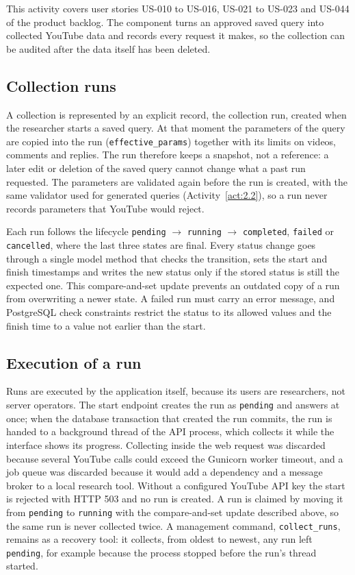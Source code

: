 This activity covers user stories US-010 to US-016, US-021 to US-023 and US-044 of the product backlog. The component turns an approved saved query into collected YouTube data and records every request it makes, so the collection can be audited after the data itself has been deleted.

\subsection{Collection runs}

A collection is represented by an explicit record, the collection run, created when the researcher starts a saved query. At that moment the parameters of the query are copied into the run (\texttt{effective\_\allowbreak params}) together with its limits on videos, comments and replies. The run therefore keeps a snapshot, not a reference: a later edit or deletion of the saved query cannot change what a past run requested. The parameters are validated again before the run is created, with the same validator used for generated queries (Activity~\ref{act:2.2}), so a run never records parameters that YouTube would reject.

Each run follows the lifecycle \texttt{pending} $\rightarrow$ \texttt{running} $\rightarrow$ \texttt{completed}, \texttt{failed} or \texttt{cancelled}, where the last three states are final. Every status change goes through a single model method that checks the transition, sets the start and finish timestamps and writes the new status only if the stored status is still the expected one. This compare-and-set update prevents an outdated copy of a run from overwriting a newer state. A failed run must carry an error message, and PostgreSQL check constraints restrict the status to its allowed values and the finish time to a value not earlier than the start.

\subsection{Execution of a run}

Runs are executed by the application itself, because its users are researchers, not server operators. The start endpoint creates the run as \texttt{pending} and answers at once; when the database transaction that created the run commits, the run is handed to a background thread of the API process, which collects it while the interface shows its progress. Collecting inside the web request was discarded because several YouTube calls could exceed the Gunicorn worker timeout, and a job queue was discarded because it would add a dependency and a message broker to a local research tool. Without a configured YouTube API key the start is rejected with HTTP 503 and no run is created. A run is claimed by moving it from \texttt{pending} to \texttt{running} with the compare-and-set update described above, so the same run is never collected twice. A management command, \texttt{collect\_runs}, remains as a recovery tool: it collects, from oldest to newest, any run left \texttt{pending}, for example because the process stopped before the run's thread started.

